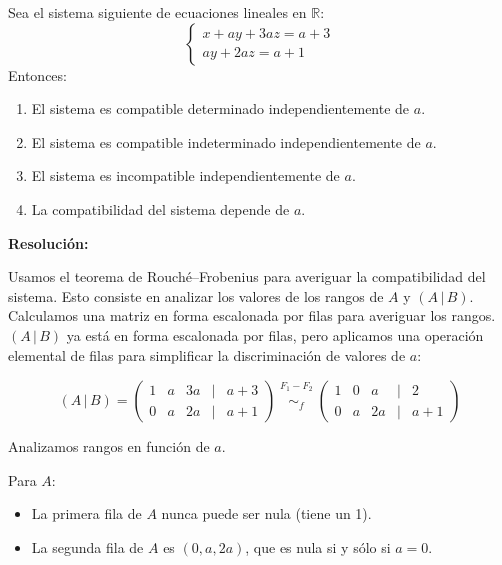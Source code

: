 \documentclass[a4paper,12pt]{article}
\begin{document}
\begin{ejercicio}[title=Ejercicio 28]
Sea el sistema siguiente de ecuaciones lineales en $\mathbb{R}$:
\[
\begin{cases}
x + ay + 3az = a + 3\\
ay + 2az = a + 1
\end{cases}
\]
Entonces:

\begin{enumerate}
\item[a)] El sistema es compatible determinado independientemente de $a$.
\item[b)] El sistema es compatible indeterminado independientemente de $a$.
\item[c)] El sistema es incompatible independientemente de $a$.
\item[d)] La compatibilidad del sistema depende de $a$.
\end{enumerate}

\tcblower
\textbf{Resolución:}

Usamos el teorema de Rouché–Frobenius para averiguar la compatibilidad del sistema. Esto consiste en analizar los valores de los rangos de $A$ y $(A\,|\,B)$. Calculamos una matriz en forma escalonada por filas para averiguar los rangos. $(A\,|\,B)$ ya está en forma escalonada por filas, pero aplicamos una operación elemental de filas para simplificar la discriminación de valores de $a$:

\[
(A\,|\,B)=
\begin{pmatrix}
1 & a & 3a &\Big|& a+3\\
0 & a & 2a &\Big|& a+1
\end{pmatrix}
\overset{\substack{F_1 - F_2\\{}}}{\sim_f}
\begin{pmatrix}
1 & 0 & a &\Big|& 2\\
0 & a & 2a &\Big|& a+1
\end{pmatrix}
\]

\vspace{0.5em}

Analizamos rangos en función de \(a\).

\vspace{0.5em}

Para \(A\):
\begin{itemize}
\item La primera fila de \(A\) nunca puede ser nula (tiene un 1).
\item La segunda fila de \(A\) es \((0,a,2a)\), que es nula si y sólo si \(a=0\).
\end{itemize}


\end{ejercicio}
\end{document}
